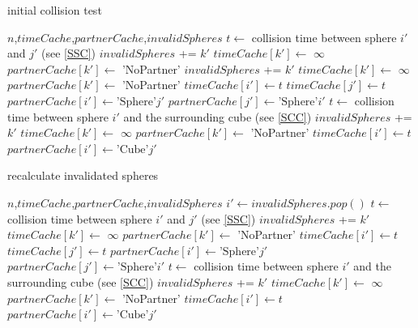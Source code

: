 \documentclass[journal, letterpaper]{IEEEtran}
\begin{document}
\begin{algorithm}
\caption{initial collision test}
\label{alg3.1}
\begin{algorithmic}
	\REQUIRE $n$,$timeCache$,$partnerCache$,$invalidSpheres$
		\STATE $t \leftarrow $ collision time between sphere $i'$ and $j'$ (see \ref{SSC})
				\STATE $invalidSpheres$ += $k'$
				\STATE $timeCache[k'] \leftarrow$ $\infty$
				\STATE $partnerCache[k'] \leftarrow$ 'NoPartner'
			\ENDIF
				\STATE $invalidSpheres$ += $k'$
				\STATE $timeCache[k'] \leftarrow$ $\infty$
				\STATE $partnerCache[k'] \leftarrow$ 'NoPartner'
			\ENDIF
			\STATE $timeCache[i'] \leftarrow t$
			\STATE $timeCache[j'] \leftarrow t$
			\STATE $partnerCache[i'] \leftarrow \text{'Sphere'}j'$
			\STATE $partnerCache[j'] \leftarrow \text{'Sphere'}i'$
		\ENDIF
	\ENDFOR
		\STATE $t \leftarrow $ collision time between sphere $i'$ and the surrounding cube (see \ref{SCC})
				\STATE $invalidSpheres$ += $k'$
				\STATE $timeCache[k'] \leftarrow$ $\infty$
				\STATE $partnerCache[k'] \leftarrow$ 'NoPartner'
			\ENDIF
			\STATE $timeCache[i'] \leftarrow t$
			\STATE $partnerCache[i'] \leftarrow \text{'Cube'}j'$
		\ENDIF
	\ENDFOR
\end{algorithmic}
\end{algorithm}

\begin{algorithm}
\caption{recalculate invalidated spheres}
\label{alg3.2}
\begin{algorithmic}
	\REQUIRE $n$,$timeCache$,$partnerCache$,$invalidSpheres$
			\STATE $i' \leftarrow invalidSpheres.pop()$
				\STATE $t \leftarrow $ collision time between sphere $i'$ and $j'$ (see \ref{SSC})
						\STATE $invalidSpheres$ += $k'$
						\STATE $timeCache[k'] \leftarrow$ $\infty$
						\STATE $partnerCache[k'] \leftarrow$ 'NoPartner'
					\ENDIF
					\STATE $timeCache[i'] \leftarrow t$
					\STATE $timeCache[j'] \leftarrow t$
					\STATE $partnerCache[i'] \leftarrow \text{'Sphere'}j'$
					\STATE $partnerCache[j'] \leftarrow \text{'Sphere'}i'$
				\ENDIF
			\ENDFOR
			\STATE $t \leftarrow $ collision time between sphere $i'$ and the surrounding cube (see \ref{SCC})
					\STATE $invalidSpheres$ += $k'$
					\STATE $timeCache[k'] \leftarrow$ $\infty$
					\STATE $partnerCache[k'] \leftarrow$ 'NoPartner'
				\ENDIF
				\STATE $timeCache[i'] \leftarrow t$
				\STATE $partnerCache[i'] \leftarrow \text{'Cube'}j'$
			\ENDIF
		\ENDWHILE
\end{algorithmic}
\end{algorithm}
\end{document}
